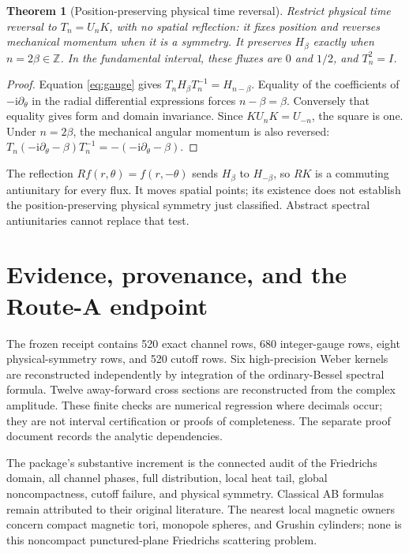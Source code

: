 \documentclass[10pt]{article}
\newcommand{\ii}{\mathrm i}
\newtheorem{theorem}{Theorem}
\begin{document}
\begin{theorem}[Position-preserving physical time reversal]
Restrict physical time reversal to $T_n=U_nK$, with no spatial reflection:
it fixes position and reverses mechanical momentum when it is a symmetry.
It preserves $H_\beta$ exactly when $n=2\beta\in\mathbb Z$.
In the fundamental interval, these fluxes are $0$ and $1/2$, and $T_n^2=I$.
\end{theorem}
\begin{proof}
Equation \eqref{eq:gauge} gives $T_nH_\beta T_n^{-1}=H_{n-\beta}$.
Equality of the coefficients of $-\ii\partial_\theta$ in the radial
differential expressions forces $n-\beta=\beta$. Conversely that equality
gives form and domain invariance. Since $KU_nK=U_{-n}$, the square is one.
Under $n=2\beta$, the mechanical angular momentum is also reversed:
$T_n(-\ii\partial_\theta-\beta)T_n^{-1}
=-(-\ii\partial_\theta-\beta)$.
\end{proof}
The reflection $Rf(r,\theta)=f(r,-\theta)$ sends $H_\beta$ to $H_{-\beta}$,
so $RK$ is a commuting antiunitary for every flux. It moves spatial points;
its existence does not establish the position-preserving physical symmetry
just classified. Abstract spectral antiunitaries cannot replace that test.

\section{Evidence, provenance, and the Route-A endpoint}
The frozen receipt contains 520 exact channel rows, 680 integer-gauge rows,
eight physical-symmetry rows, and 520 cutoff rows. Six high-precision Weber
kernels are reconstructed independently by integration of the ordinary-Bessel
spectral formula. Twelve away-forward cross sections are reconstructed from
the complex amplitude. These finite checks are numerical regression where
decimals occur; they are not interval certification or proofs of completeness.
The separate proof document records the analytic dependencies.

The package's substantive increment is the connected audit of the Friedrichs
domain, all channel phases, full distribution, local heat tail, global
noncompactness, cutoff failure, and physical symmetry. Classical AB formulas
remain attributed to their original literature. The nearest local magnetic
owners concern compact magnetic tori, monopole spheres, and Grushin cylinders;
none is this noncompact punctured-plane Friedrichs scattering problem.
\end{document}
